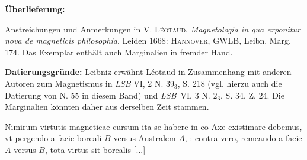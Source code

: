 \begin{ledgroupsized}[r]{120mm}
\footnotesize 
\pstart 
\noindent\textbf{\"{U}berlieferung:}
\pend
\end{ledgroupsized}
\begin{ledgroupsized}[r]{114mm}
\footnotesize 
\pstart
\parindent -6mm
%
Anstreichungen und Anmerkungen in \cite{01061}V. \textsc{Léotaud},\protect{} \textit{Magnetologia in qua exponitur nova de magneticis philosophia}, Leiden 1668: \textsc{Hannover}, GWLB, Leibn. Marg. 174. Das Exemplar enthält auch Marginalien in fremder Hand.
\pend
\end{ledgroupsized}
%
\vspace*{5mm}
\begin{ledgroup}
\footnotesize 
\pstart
\noindent\footnotesize{\textbf{Datierungsgr\"{u}nde:}
Leibniz erwähnt Léotaud in Zusammenhang mit anderen Autoren zum Magnetis\-mus in \cite{01070}\textit{LSB} VI, 2 N. $39_3$, S. 218 (vgl. hierzu auch die Datierung von N. 55
in diesem Band) und \cite{01071}\textit{LSB}~VI, 3 N. $2_3$, S. 34, Z. 24. Die Marginalien könnten daher aus derselben Zeit stammen.}
\pend
\end{ledgroup}
%
\vspace*{8mm}
\count{}
\count{}
\count{}
\pstart 
\normalsize\noindent
[p. 74] Nimirum virtutis magneticae cursum ita se habere in eo Axe\protect{} existimare debemus, vt pergendo a facie boreali $B$ versus Australem $A$, : contra vero, remeando a facie $A$ versus $B$, tota virtus sit borealis [...]
\pend 
\pstart  
